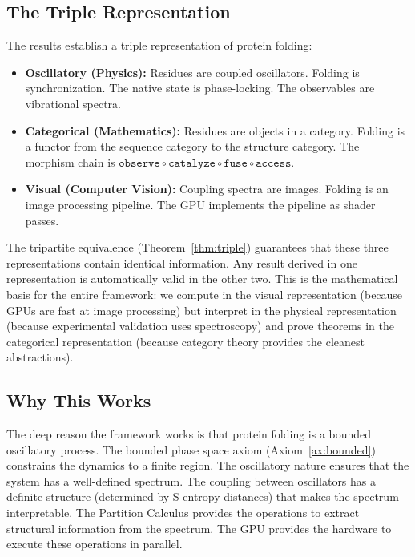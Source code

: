 \documentclass[11pt,twocolumn,a4paper]{article}
\theoremstyle{definition}
\theoremstyle{remark}
\begin{document}
\subsection{The Triple Representation}

The results establish a triple representation of protein folding:

\begin{itemize}
    \item \textbf{Oscillatory (Physics):} Residues are coupled oscillators. Folding is synchronization. The native state is phase-locking. The observables are vibrational spectra.
    \item \textbf{Categorical (Mathematics):} Residues are objects in a category. Folding is a functor from the sequence category to the structure category. The morphism chain is $\texttt{observe} \circ \texttt{catalyze} \circ \texttt{fuse} \circ \texttt{access}$.
    \item \textbf{Visual (Computer Vision):} Coupling spectra are images. Folding is an image processing pipeline. The GPU implements the pipeline as shader passes.
\end{itemize}

The tripartite equivalence (Theorem~\ref{thm:triple}) guarantees that these three representations contain identical information. Any result derived in one representation is automatically valid in the other two. This is the mathematical basis for the entire framework: we compute in the visual representation (because GPUs are fast at image processing) but interpret in the physical representation (because experimental validation uses spectroscopy) and prove theorems in the categorical representation (because category theory provides the cleanest abstractions).

\subsection{Why This Works}

The deep reason the framework works is that protein folding is a bounded oscillatory process. The bounded phase space axiom (Axiom~\ref{ax:bounded}) constrains the dynamics to a finite region. The oscillatory nature ensures that the system has a well-defined spectrum. The coupling between oscillators has a definite structure (determined by S-entropy distances) that makes the spectrum interpretable. The Partition Calculus provides the operations to extract structural information from the spectrum. The GPU provides the hardware to execute these operations in parallel.
\end{document}
